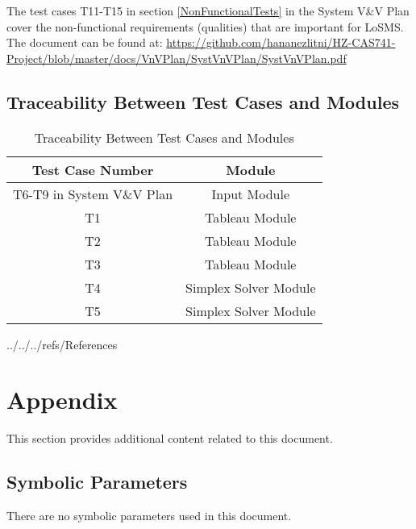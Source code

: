\documentclass[12pt, titlepage]{article}
\newcommand{\famname}{LoSMS}
\begin{document}
The test cases T11-T15 in section \ref{NonFunctionalTests} in the System V\&V 
Plan cover the non-functional requirements (qualities) that are important for 
\famname{}. The document can be found at: 
\url{https://github.com/hananezlitni/HZ-CAS741-Project/blob/master/docs/VnVPlan/SystVnVPlan/SystVnVPlan.pdf}

\subsection{Traceability Between Test Cases and Modules}

\begin{table} [h!]
	\centering
	\begin{tabular}{|c|c|}
		\hline	
		\textbf{Test Case Number} & \textbf{Module}\\
		\hline 
		T6-T9 in System V\&V Plan& Input Module\\ \hline
		T1& Tableau Module\\ \hline
		T2& Tableau Module\\ \hline
		T3& Tableau Module\\ \hline
		T4& Simplex Solver Module\\ \hline
		T5& Simplex Solver Module\\ \hline
	\end{tabular}
	\caption{Traceability Between Test Cases and Modules}
	\label{Table:Traceability} 
\end{table}

\newpage


 {../../../refs/References}

\newpage

\section{Appendix}

This section provides additional content related to this document.

\subsection{Symbolic Parameters}

There are no symbolic parameters used in this document.
\end{document}
